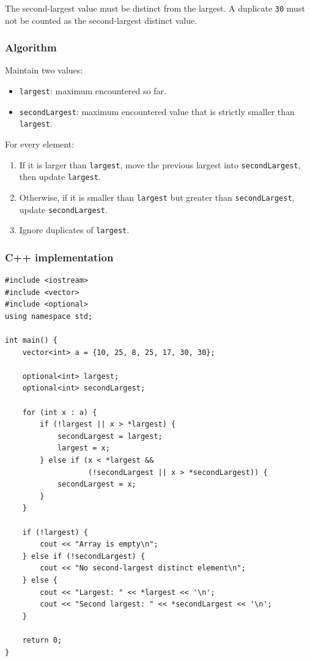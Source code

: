 The second-largest value must be distinct from the largest. A duplicate \texttt{30} must not be counted as the second-largest distinct value.

\subsubsection{Algorithm}

Maintain two values:

\begin{itemize}
    \item \texttt{largest}: maximum encountered so far.
    \item \texttt{secondLargest}: maximum encountered value that is strictly smaller than \texttt{largest}.
\end{itemize}

For every element:

\begin{enumerate}
    \item If it is larger than \texttt{largest}, move the previous largest into \texttt{secondLargest}, then update \texttt{largest}.
    \item Otherwise, if it is smaller than \texttt{largest} but greater than \texttt{secondLargest}, update \texttt{secondLargest}.
    \item Ignore duplicates of \texttt{largest}.
\end{enumerate}

\subsubsection{C++ implementation}

\begin{lstlisting}[style=cppstyle]
#include <iostream>
#include <vector>
#include <optional>
using namespace std;

int main() {
    vector<int> a = {10, 25, 8, 25, 17, 30, 30};

    optional<int> largest;
    optional<int> secondLargest;

    for (int x : a) {
        if (!largest || x > *largest) {
            secondLargest = largest;
            largest = x;
        } else if (x < *largest &&
                   (!secondLargest || x > *secondLargest)) {
            secondLargest = x;
        }
    }

    if (!largest) {
        cout << "Array is empty\n";
    } else if (!secondLargest) {
        cout << "No second-largest distinct element\n";
    } else {
        cout << "Largest: " << *largest << '\n';
        cout << "Second largest: " << *secondLargest << '\n';
    }

    return 0;
}
\end{lstlisting}

